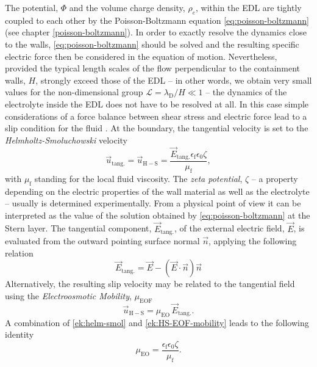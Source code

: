 \begin{versiona}
The potential, $\Phi$ and the volume charge density, $\rho_{e}$, within the EDL are tightly coupled to each other by the Poisson-Boltzmann equation \eqref{eq:poisson-boltzmann} (see chapter \ref{poisson-boltzmann}). In order to exactly resolve the dynamics close to the walls, \eqref{eq:poisson-boltzmann} should be solved and the resulting specific electric force then be considered in the equation of motion. Nevertheless,  provided the typical length scales of the flow perpendicular to the containment walls, $H$, strongly exceed those of the EDL -- in other words, we obtain very small values for the non-dimensional group $\mathcal{L} = \lambda_{\mathrm{D}}/H \ll 1$ -- the dynamics of the electrolyte inside the EDL does not have to be resolved at all. In this case simple considerations of a force balance between shear stress and electric force lead to a slip condition for the fluid \cite{YaFuLi:2001}. At the boundary, the tangential velocity is set to the \textit{Helmholtz-Smoluchowski} velocity
\begin{equation}
\label{ek:helm-smol}
\vec{u}_{\mathrm{tang.}}=\vec{u}_{\mathrm{H-S}} = \frac{\vec{E}_{\mathrm{tang.}}\epsilon_{\mathrm{f}}\epsilon_{0}\zeta}{\mu_{\mathrm{f}}},
\end{equation}
with $\mu_{\mathrm{f}}$ standing for the local fluid viscosity. The \textit{zeta potential}, $\zeta$ -- a property depending on the electric properties of the wall material as well as the electrolyte -- usually is determined experimentally. From a physical point of view it can be interpreted as the value of the solution obtained by \eqref{eq:poisson-boltzmann} at the Stern layer. The tangential component, $\vec{E}_{\mathrm{tang.}}$,  of the external electric field, $\vec{E}$, is evaluated from the outward pointing surface normal $\vec{n}$, applying the following relation
\begin{equation}
\label{ek:etang}
\vec{E}_{\mathrm{tang.}} = \vec{E} - \left(\vec{E}\cdot\vec{n}\right)\vec{n}
\end{equation}
Alternatively, the resulting slip velocity may be related to the tangential field using the \textit{Electroosmotic Mobility}, $\mu_{\mathrm{EOF}}$
\begin{equation}
\label{ek:HS-EOF-mobility}
\vec{u}_{\mathrm{H-S}} = \mu_{\mathrm{EO}}\,\vec{E}_{\mathrm{tang.}}.
\end{equation}
A combination of \eqref{ek:helm-smol} and \eqref{ek:HS-EOF-mobility} leads to the following identity
\begin{equation}
\label{ek:EOF-mobility}
\mu_{\mathrm{EO}} =\frac{\epsilon_{\mathrm{f}}\epsilon_{0}\zeta}{\mu_{\mathrm{f}}}.
\end{equation}


\end{versiona}
